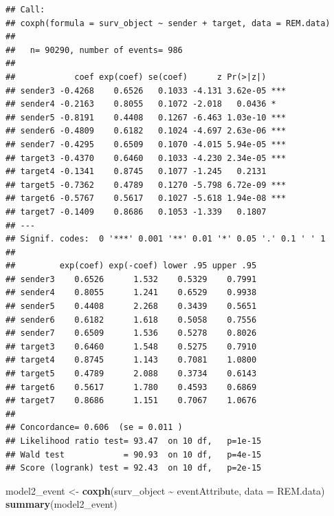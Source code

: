 \documentclass[
]{article}
\newenvironment{Shaded}{\begin{snugshade}}{\end{snugshade}}
\newcommand{\AttributeTok}[1]{\textcolor[rgb]{0.13,0.29,0.53}{#1}}
\newcommand{\FunctionTok}[1]{\textcolor[rgb]{0.13,0.29,0.53}{\textbf{#1}}}
\newcommand{\NormalTok}[1]{#1}
\newcommand{\OtherTok}[1]{\textcolor[rgb]{0.56,0.35,0.01}{#1}}
\newcommand{\SpecialCharTok}[1]{\textcolor[rgb]{0.81,0.36,0.00}{\textbf{#1}}}
\begin{document}
\begin{verbatim}
## Call:
## coxph(formula = surv_object ~ sender + target, data = REM.data)
## 
##   n= 90290, number of events= 986 
## 
##            coef exp(coef) se(coef)      z Pr(>|z|)    
## sender3 -0.4268    0.6526   0.1033 -4.131 3.62e-05 ***
## sender4 -0.2163    0.8055   0.1072 -2.018   0.0436 *  
## sender5 -0.8191    0.4408   0.1267 -6.463 1.03e-10 ***
## sender6 -0.4809    0.6182   0.1024 -4.697 2.63e-06 ***
## sender7 -0.4295    0.6509   0.1070 -4.015 5.94e-05 ***
## target3 -0.4370    0.6460   0.1033 -4.230 2.34e-05 ***
## target4 -0.1341    0.8745   0.1077 -1.245   0.2131    
## target5 -0.7362    0.4789   0.1270 -5.798 6.72e-09 ***
## target6 -0.5767    0.5617   0.1027 -5.618 1.94e-08 ***
## target7 -0.1409    0.8686   0.1053 -1.339   0.1807    
## ---
## Signif. codes:  0 '***' 0.001 '**' 0.01 '*' 0.05 '.' 0.1 ' ' 1
## 
##         exp(coef) exp(-coef) lower .95 upper .95
## sender3    0.6526      1.532    0.5329    0.7991
## sender4    0.8055      1.241    0.6529    0.9938
## sender5    0.4408      2.268    0.3439    0.5651
## sender6    0.6182      1.618    0.5058    0.7556
## sender7    0.6509      1.536    0.5278    0.8026
## target3    0.6460      1.548    0.5275    0.7910
## target4    0.8745      1.143    0.7081    1.0800
## target5    0.4789      2.088    0.3734    0.6143
## target6    0.5617      1.780    0.4593    0.6869
## target7    0.8686      1.151    0.7067    1.0676
## 
## Concordance= 0.606  (se = 0.011 )
## Likelihood ratio test= 93.47  on 10 df,   p=1e-15
## Wald test            = 90.93  on 10 df,   p=4e-15
## Score (logrank) test = 92.43  on 10 df,   p=2e-15
\end{verbatim}

\begin{Shaded}
\begin{Highlighting}[]
\NormalTok{model2\_event }\OtherTok{\textless{}{-}} \FunctionTok{coxph}\NormalTok{(surv\_object }\SpecialCharTok{\textasciitilde{}}\NormalTok{ eventAttribute, }\AttributeTok{data =}\NormalTok{ REM.data)}
\FunctionTok{summary}\NormalTok{(model2\_event)}
\end{Highlighting}
\end{Shaded}
\end{document}
